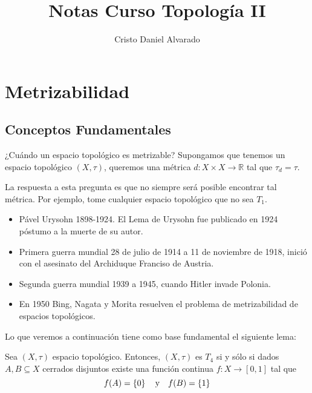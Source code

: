 \documentclass[12pt]{report}
\theoremstyle{largebreak}
\newcommand\cf[3]{\ensuremath{#1:#2\rightarrow#3}}
\begin{document}
    \setlength{\parskip}{5pt} %
    \setlength{\parindent}{12pt} %
    \title{Notas Curso Topología II}
    \author{Cristo Daniel Alvarado}
    \maketitle

    \tableofcontents %

    
    \chapter{Metrizabilidad}
    
    \section{Conceptos Fundamentales}
    
    ¿Cuándo un espacio topológico es metrizable? Supongamos que tenemos un espacio topológico $(X,\tau)$, queremos una métrica $\cf{d}{X\times X}{\mathbb{R}}$ tal que $\tau_d=\tau$.

    La respuesta a esta pregunta es que no siempre será posible encontrar tal métrica. Por ejemplo, tome cualquier espacio topológico que no sea $T_1$.

    \begin{itemize}
        \item Pável Urysohn 1898-1924. El Lema de Urysohn fue publicado en 1924 póstumo a la muerte de su autor.
        \item Primera guerra mundial 28 de julio de 1914 a 11 de noviembre de 1918, inició con el asesinato del Archiduque Franciso de Austria.
        \item Segunda guerra mundial 1939 a 1945, cuando Hitler invade Polonia.
        \item En 1950 Bing, Nagata y Morita resuelven el problema de metrizabilidad de espacios topológicos.
    \end{itemize}

    Lo que veremos a continuación tiene como base fundamental el siguiente lema:

    \begin{lema}
        Sea $(X,\tau)$ espacio topológico. Entonces, $(X,\tau)$ es $T_4$ si y sólo si dados $A,B\subseteq X$ cerrados disjuntos existe una función continua $\cf{f}{X}{[0,1]}$ tal que
        \begin{equation*}
            f(A)=\left\{0\right\} \quad\textup{y}\quad f(B)=\left\{1\right\}
        \end{equation*}
    \end{lema}
\end{document}
